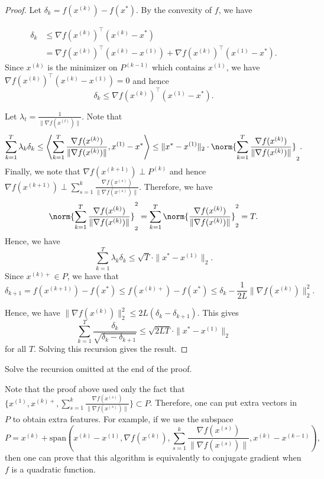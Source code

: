 \begin{proof}
Let $\delta_{k}=f(x^{(k)})-f(x^{*})$. By the convexity of $f$, we
have

\begin{align*}
\delta_{k} & \leq\nabla f(x^{(k)})^{\top}(x^{(k)}-x^{*})\\
 & =\nabla f(x^{(k)})^{\top}(x^{(k)}-x^{(1)})+\nabla f(x^{(k)})^{\top}(x^{(1)}-x^{*}).
\end{align*}
Since $x^{(k)}$ is the minimizer on $P^{(k-1)}$ which contains $x^{(1)}$,
we have $\nabla f(x^{(k)})^{\top}(x^{(k)}-x^{(1)})=0$ and hence
\[
\delta_{k}\leq\nabla f(x^{(k)})^{\top}(x^{(1)}-x^{*}).
\]

Let $\lambda_{t}=\frac{1}{\|\nabla f(x^{(t)})\|}$. Note that
\[
\sum_{k=1}^{T}\lambda_{k}\delta_{k}\leq\left\langle \sum_{k=1}^{T}\frac{\nabla f(x^{(k)})}{\|\nabla f(x^{(k)})\|},x^{(1)}-x^{*}\right\rangle \leq\|x^{*}-x^{(1)}\|_{2}\cdot\norm{\sum_{k=1}^{T}\frac{\nabla f(x^{(k)})}{\|\nabla f(x^{(k)})\|}}_{2}.
\]
Finally, we note that $\nabla f(x^{(k+1)})\perp P^{(k)}$ and hence
$\nabla f(x^{(k+1)})\perp\sum_{s=1}^{k}\frac{\nabla f(x^{(s)})}{\|\nabla f(x^{(s)})\|}$.
Therefore, we have 
\[
\norm{\sum_{k=1}^{T}\frac{\nabla f(x^{(k)})}{\|\nabla f(x^{(k)})\|}}_{2}^{2}=\sum_{k=1}^{T}\norm{\frac{\nabla f(x^{(k)})}{\|\nabla f(x^{(k)})\|}}_{2}^{2}=T.
\]
Hence, we have
\[
\sum_{k=1}^{T}\lambda_{k}\delta_{k}\leq\sqrt{T}\cdot\|x^{*}-x^{(1)}\|_{2}.
\]
Since $x^{(k)+}\in P$, we have that 
\[
\delta_{k+1}=f(x^{(k+1)})-f(x^{*})\leq f(x^{(k)+})-f(x^{*})\leq\delta_{k}-\frac{1}{2L}\|\nabla f(x^{(k)})\|_{2}^{2}.
\]

Hence, we have $\|\nabla f(x^{(k)})\|_{2}^{2}\leq2L(\delta_{k}-\delta_{k+1})$.
This gives
\[
\sum_{k=1}^{T}\frac{\delta_{k}}{\sqrt{\delta_{k}-\delta_{k+1}}}\leq\sqrt{2LT}\cdot\|x^{*}-x^{(1)}\|_{2}
\]
for all $T$. Solving this recursion gives the result.
\end{proof}
\begin{xca}
Solve the recursion omitted at the end of the proof.
\end{xca}

Note that the proof above used only the fact that $\{x^{(1)},x^{(k)+},\sum_{s=1}^{k}\frac{\nabla f(x^{(s)})}{\|\nabla f(x^{(s)})\|}\}\subset P$.
Therefore, one can put extra vectors in $P$ to obtain extra features.
For example, if we use the subspace
\[
P=x^{(k)}+\mathrm{span}(x^{(k)}-x^{(1)},\nabla f(x^{(k)}),\sum_{s=1}^{k}\frac{\nabla f(x^{(s)})}{\|\nabla f(x^{(s)})\|},x^{(k)}-x^{(k-1)}),
\]
then one can prove that this algorithm is equivalently to conjugate
gradient when $f$ is a quadratic function.

